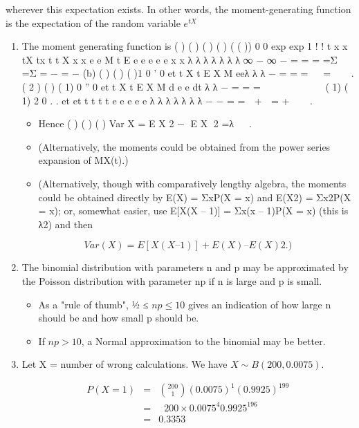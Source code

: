 \documentclass[a4paper,12pt]{article}
\begin{document}
wherever this expectation exists. In other words, the moment-generating function is the expectation of the random variable 
${\displaystyle e^{tX}} $
\begin{enumerate}
\item  The moment generating function is
( ) ( ) ( ) ( ) ( ( ))
0 0
exp exp 1
! !
t x x
tX tx t t
X
x x
e e M t E e e e e e
x x
λ
λ λ λ λ λ λ
∞ − ∞
−
= =
= =Σ =Σ = − = −
(b) ( ) ( ) ( )1
0
' 0
et t
X
t
E X M eeλ
λ λ −
=
= =   =  
.
( 2 ) ( ) ( 1)
0
'' 0
et t
X
t
E X M d e e
dt
λ λ −
=
= =         
( 1) ( 1) 2
0
. .
et et t t t
t
e e e e e λ λ λ λ λ λ λ − −
=
=  +  = +  
.
\begin{itemize}
    \item Hence ( ) ( ) ( ) Var X = E X 2 − E X 2 =λ   .
    \item (Alternatively, the moments could be obtained from the power series
expansion of MX(t).)
    \item (Alternatively, though with comparatively lengthy algebra, the
moments could be obtained directly by E(X) = ΣxP(X = x) and E(X2) =
Σx2P(X = x); or, somewhat easier, use E[X(X – 1)] = Σx(x – 1)P(X = x)
(this is λ2) and then 
\end{itemize}

\[Var(X) = E[X(X – 1)] + E(X) – {E(X)}2.)\]
\item  The binomial distribution with parameters n and p may be
approximated by the Poisson distribution with parameter np if n is large and p is small.
\begin{itemize}
    \item  As a "rule of thumb", ½ ≤ $np \leq 10$ gives an
indication of how large n should be and how small p should be. 
    \item If
$np > 10$, a Normal approximation to the binomial may be better.
\end{itemize}


\item  Let X = number of wrong calculations. We have $X \sim B(200, 0.0075)$.

\begin{eqnarray*}
P(X=1) &=& { 200 \choose 1}(0.0075)^1(0.9925)^{199} \\
&=&  200 \times  0.0075^4 0.9925^{196}\\
&=& 0.3353\\
\end{eqnarray*}


\end{enumerate}
\end{document}
